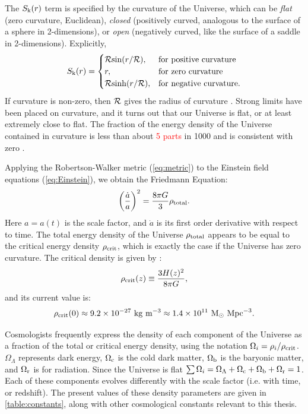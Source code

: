 The $S_{\rm k}(r)$ term is specified by the curvature of the Universe, which can be {\it flat} (zero curvature, Euclidean), {\it closed} (positively curved, analogous to the surface of a sphere in 2-dimensions), or {\it open} (negatively curved, like the surface of a saddle in 2-dimensions). Explicitly,
\begin{equation}
S_{\rm k}(r) = 
    \begin{cases}
        {\cal R}{\rm sin}(r/{\cal R}), & \text{for positive curvature} \\
        r,              & \text{for zero curvature} \\
        {\cal R}{\rm sinh}(r/{\cal R}), & \text{for negative curvature.}
    \end{cases}
\end{equation}
If curvature is non-zero, then $\cal R$ gives the radius of curvature \citep{RydenText}. Strong limits have been placed on curvature, and it turns out that our Universe is flat, or at least extremely close to flat. The fraction of the energy density of the Universe contained in curvature is less than about \textcolor{red}{5 parts} in 1000 and is consistent with zero \citep{PlanckXVI}.

Applying the Robertson-Walker metric (\autoref{eq:metric}) to the Einstein field equations (\autoref{eq:Einstein}), we obtain the Friedmann Equation:
\begin{equation}
\left( \frac{\dot a}{a} \right)^2 = \frac{8\pi G}{3} \rho_{\rm total}.
\end{equation}
Here $a=a(t)$ is the scale factor, and $\dot a$ is its first order derivative with respect to time. The total energy density of the Universe $\rho_{\rm total}$ appears to be equal to the critical energy density $\rho_{\rm crit}$, which is exactly the case if the Universe has zero curvature. The critical density is given by \citep{RydenText}:
\begin{equation}
\rho_{\rm crit}(z) \equiv \frac{3H(z)^2}{8\pi G},
\end{equation}
and its current value is:
\begin{equation}
\rho_{\rm crit}(0) \approx 9.2 \times 10^{-27}\ {\rm kg}\ {\rm m}^{-3} \approx 1.4 \times 10^{11}\ {\rm M}_{\odot}\ {\rm Mpc}^{-3}.
\end{equation}

Cosmologists frequently express the density of each component of the Universe as a fraction of the total or critical energy density, using the notation $\Omega_i = \rho_i / \rho_{\rm crit}$. $\Omega_{\Lambda}$ represents dark energy, $\Omega_{\rm c}$ is the cold dark matter, $\Omega_{\rm b}$ is the baryonic matter, and $\Omega_{\rm r}$ is for radiation. Since the Universe is flat $\sum \Omega_i = \Omega_{\Lambda} + \Omega_{\rm c} + \Omega_{\rm b} + \Omega_{\rm r} =1$. Each of these components evolves differently with the scale factor (i.e. with time, or redshift). The present values of these density parameters are given in \autoref{table:constants}, along with other cosmological constants relevant to this thesis.


